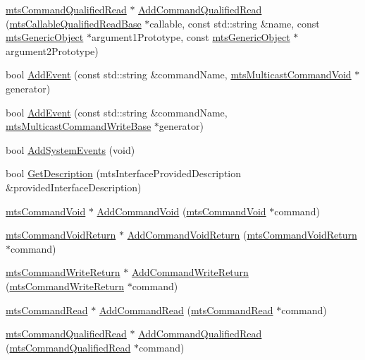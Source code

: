 \begin{DoxyCompactItemize}
\item 
\hyperlink{classmts_command_qualified_read}{mts\+Command\+Qualified\+Read} $\ast$ \hyperlink{classmts_interface_provided_a8c75f78b80489039839ac45ba152acf6}{Add\+Command\+Qualified\+Read} (\hyperlink{classmts_callable_qualified_read_base}{mts\+Callable\+Qualified\+Read\+Base} $\ast$callable, const std\+::string \&name, const \hyperlink{classmts_generic_object}{mts\+Generic\+Object} $\ast$argument1\+Prototype, const \hyperlink{classmts_generic_object}{mts\+Generic\+Object} $\ast$argument2\+Prototype)
\item 
bool \hyperlink{classmts_interface_provided_ac10644a4bff7c746528c4442dab69b64}{Add\+Event} (const std\+::string \&command\+Name, \hyperlink{classmts_multicast_command_void}{mts\+Multicast\+Command\+Void} $\ast$generator)
\item 
bool \hyperlink{classmts_interface_provided_abeaef52139a77f3100bf9f437a24acc1}{Add\+Event} (const std\+::string \&command\+Name, \hyperlink{classmts_multicast_command_write_base}{mts\+Multicast\+Command\+Write\+Base} $\ast$generator)
\item 
bool \hyperlink{classmts_interface_provided_aea73142d6bfe70f30be9ef051c3ac754}{Add\+System\+Events} (void)
\item 
bool \hyperlink{classmts_interface_provided_ab6c844e481cf4e5e6ba59e1c61341f4e}{Get\+Description} (mts\+Interface\+Provided\+Description \&provided\+Interface\+Description)
\end{DoxyCompactItemize}
{\bf }\par
\begin{DoxyCompactItemize}
\item 
\hyperlink{classmts_command_void}{mts\+Command\+Void} $\ast$ \hyperlink{classmts_interface_provided_a411ee94b6d040a454f335621cc66ba50}{Add\+Command\+Void} (\hyperlink{classmts_command_void}{mts\+Command\+Void} $\ast$command)
\item 
\hyperlink{classmts_command_void_return}{mts\+Command\+Void\+Return} $\ast$ \hyperlink{classmts_interface_provided_a8f3e25f5f8c61db7375f0a88dca6d8fe}{Add\+Command\+Void\+Return} (\hyperlink{classmts_command_void_return}{mts\+Command\+Void\+Return} $\ast$command)
\item 
\hyperlink{classmts_command_write_return}{mts\+Command\+Write\+Return} $\ast$ \hyperlink{classmts_interface_provided_a1ce140f4fdc8cf6051f5a40c2dd631db}{Add\+Command\+Write\+Return} (\hyperlink{classmts_command_write_return}{mts\+Command\+Write\+Return} $\ast$command)
\item 
\hyperlink{classmts_command_read}{mts\+Command\+Read} $\ast$ \hyperlink{classmts_interface_provided_a58cd0b600035f04a7b9913d32e2dc20c}{Add\+Command\+Read} (\hyperlink{classmts_command_read}{mts\+Command\+Read} $\ast$command)
\item 
\hyperlink{classmts_command_qualified_read}{mts\+Command\+Qualified\+Read} $\ast$ \hyperlink{classmts_interface_provided_aaf37a3985a0b02afcbcff20a2e942161}{Add\+Command\+Qualified\+Read} (\hyperlink{classmts_command_qualified_read}{mts\+Command\+Qualified\+Read} $\ast$command)
\end{DoxyCompactItemize}

